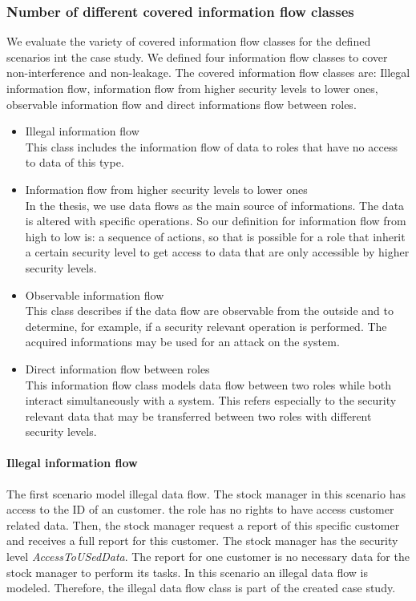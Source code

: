 \subsubsection{Number of different covered information flow classes}
We evaluate the variety of covered information flow classes for the defined scenarios int the case study. We defined four information flow classes to cover non-interference and non-leakage. The covered information flow classes are: Illegal information flow, information flow from higher security levels to lower ones, observable information flow and direct informations flow between roles.  
\begin{itemize}
\item Illegal information flow \\
This class includes the information flow of data to roles that  have no access to data of this type. %
\item Information flow from higher security levels to lower ones\\ In the thesis, we use data flows as the main source of informations. The data is altered with specific operations. So our definition for information flow from high to low is: a sequence of actions, so that is possible for a role that inherit a certain security level to get access to data that are only accessible by higher security levels. 
\item Observable information flow \\ This class describes if the data flow are observable from the outside and to determine, for example, if a security relevant operation is performed. The acquired informations may be used for an attack on the system.
\item Direct information flow between roles\\ This information flow class models data flow between two roles while both interact simultaneously with a system. This refers especially to the security relevant data that may be transferred between two roles with different security levels.
\end{itemize}
\paragraph{Illegal information flow}
The first scenario model illegal data flow. The stock manager in this scenario has access to the ID of an customer. the role has no rights to have access customer related data. Then, the stock manager request a report of this specific customer and receives a full report for this customer. The stock manager has the security level \textit{AccessToUSedData}. The report for one customer is no necessary data for the stock manager to perform its tasks. In this scenario an illegal data flow is modeled. Therefore, the illegal data flow class is part of the created case study.
